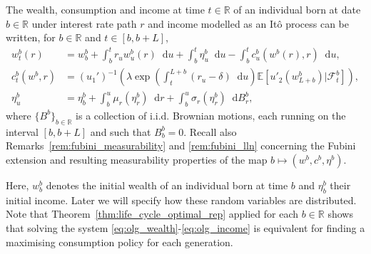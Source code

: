 \documentclass[11pt,oneside,english,reqno,dvipsnames,table]{amsart}
\numberwithin{equation}{section}
\theoremstyle{plain}
\theoremstyle{definition}
\theoremstyle{remark}
\theoremstyle{plain}
\theoremstyle{plain}
\theoremstyle{plain}
\theoremstyle{plain}
\theoremstyle{plain}
\theoremstyle{plain}
\theoremstyle{plain}
\newcommand{\blue}[1]{#1}
\newcommand{\cF}{\mathcal{F}}
\newcommand{\EE}{\mathbb{E}}
\newcommand{\dd}{\mathop{}\!\mathrm{d}}
\newcommand{\mbR}{\mathbb{R}}
\numberwithin{thm}{section}
\begin{document}
The wealth, consumption and income at time $t \in \mbR$ of an individual born at date $b \in \mbR$  under interest rate path $r$ and income modelled as an It\^o process can be written, for $b\in \mbR$ and $t\in [b,b+L]$, 
%
\begin{align}
%
        w^b_t(r) &= w^b_b + \int_b^t r_u w^{b}_u(r) \dd u + \int_b^t \eta^b_u  \dd u - \int_b^t c_u^b(w^b(r),r) \dd u, \label{eq:olg_wealth}
        \\
          c_t^{b}(w^b,r) &= (u_1')^{-1}\left(\lambda \exp\left(\int_t^{L+b} (r_u-\delta)\dd u\right)\EE\left[ u'_2\left(w_{L+b}^{b}\right)|\cF_t^b \right]\right),  \label{eq:olg_consumption}\\
\eta^b_u &= \eta^b_b +\int_{b}^u \mu_r(\eta^b_r) \dd r + \int_{b}^u \sigma_r(\eta^b_r) \dd B^b_r, \label{eq:olg_income}
%
%
\end{align}
%
where $\{B^b\}_{b\in \mbR}$ is a collection of i.i.d. Brownian motions, each running on the interval $[b,b+L]$ and such that $B^b_{b}=0$.\blue{ Recall  also Remarks~\ref{rem:fubini_measurability} and \ref{rem:fubini_lln} concerning the Fubini extension and resulting measurability properties of the map $b\mapsto (w^b,c^b,\eta^b)$.}

Here, $w_{b}^{b}$ denotes the initial wealth of an individual born at time $b$ and $\eta^b_b$ their initial income. Later we will specify how these random variables are distributed. Note that Theorem~\ref{thm:life_cycle_optimal_rep} applied for each $b\in \mbR$ shows that solving the system \eqref{eq:olg_wealth}-\eqref{eq:olg_income} is equivalent for finding a maximising consumption policy for each generation.
%
%
\end{document}
